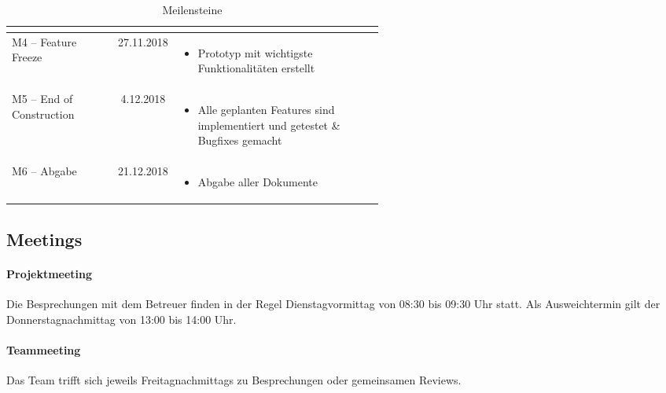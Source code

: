 \begin{table}[H]
\begin{tabular}{|l|c|p{0.55\linewidth}|}
\begin{itemize}
            \vspace{-\topsep}
        \end{itemize} \\ \hline
        M4 – Feature Freeze & 27.11.2018 &
        \vspace{-7mm}
        \begin{itemize}
            \setlength\itemsep{0mm}
            \item Prototyp mit wichtigste Funktionalitäten erstellt
            \vspace{-\topsep}
        \end{itemize} \\ \hline
        M5 – End of Construction & 4.12.2018 &
        \vspace{-7mm}
        \begin{itemize}
            \setlength\itemsep{0mm}
            \item Alle geplanten Features sind implementiert und getestet \& Bugfixes gemacht
            \vspace{-\topsep}
        \end{itemize} \\ \hline
        M6 – Abgabe & 21.12.2018 & 
        \vspace{-7mm}
        \begin{itemize}
            \setlength\itemsep{0mm}
            \item Abgabe aller Dokumente
            \vspace{-\topsep}
        \end{itemize} \\ \hline

    \end{tabular}
    \caption{Meilensteine}
\end{table}


\subsection{Meetings}
\paragraph{Projektmeeting}
Die Besprechungen mit dem Betreuer finden in der Regel Dienstagvormittag von 08:30 bis 09:30 Uhr statt. Als Ausweichtermin gilt der Donnerstagnachmittag von 13:00 bis 14:00 Uhr.
\paragraph{Teammeeting}
Das Team trifft sich jeweils Freitagnachmittags zu Besprechungen oder gemeinsamen Reviews.